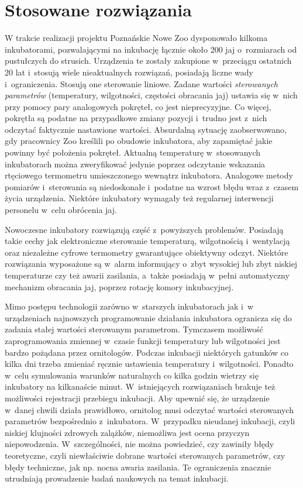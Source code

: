\section{Stosowane rozwiązania}
W trakcie realizacji projektu Poznańskie Nowe Zoo dysponowało kilkoma
inkubatorami, pozwalającymi na inkubację łącznie około 200 jaj o~rozmiarach od
pustułczych do strusich. Urządzenia te zostały zakupione w~przeciągu ostatnich
20 lat i~stosują wiele nieaktualnych rozwiązań, posiadają liczne wady
i~ograniczenia. Stosują one sterowanie liniowe. Zadane wartości \emph{sterowanych
parametrów} (temperatury, wilgotności, częstości obracania jaj) ustawia się
w~nich przy pomocy pary analogowych pokręteł, co jest nieprecyzyjne. Co więcej,
pokrętła są podatne na przypadkowe zmiany pozycji i~trudno jest z~nich odczytać
faktycznie nastawione wartości. Absurdalną sytuację zaobserwowano, gdy
pracownicy Zoo kreślili po obudowie inkubatora, aby zapamiętać jakie powinny być
położenia pokręteł. Aktualną temperaturę w~stosowanych
inkubatorach można zweryfikować jedynie poprzez odczytanie wskazania rtęciowego
termometru umieszczonego wewnątrz inkubatora. Analogowe metody pomiarów
i~sterowania są niedoskonałe i~podatne na wzrost błędu wraz z~czasem życia
urządzenia. Niektóre inkubatory wymagały też regularnej interwencji personelu
w~celu obrócenia jaj.

Nowoczesne inkubatory \cite{Brinsea} \cite{Metzer} rozwiązują część z~powyższych problemów. Posiadają takie
cechy jak elektroniczne sterowanie temperaturą, wilgotnością i~wentylacją oraz
niezależne cyfrowe termometry gwarantujące obiektywny odczyt. Niektóre
rozwiązania wyposażone są w~alarm informujący o~zbyt wysokiej lub zbyt niskiej
temperaturze czy też awarii zasilania, a~także posiadają w~pełni automatyczny
mechanizm obracania jaj, poprzez rotację komory inkubacyjnej.

Mimo postępu technologii zarówno w~starszych inkubatorach jak i~w urządzeniach najnowszych programowanie działania inkubatora ogranicza się do zadania stałej wartości
sterowanym parametrom. Tymczasem możliwość zaprogramowania zmiennej w~czasie
funkcji temperatury lub wilgotności jest bardzo pożądana przez ornitologów.
Podczas inkubacji niektórych gatunków co kilka dni trzeba zmieniać ręcznie
ustawienia temperatury i~wilgotności. Ponadto w~celu symulowania warunków
naturalnych co kilka godzin wietrzy się inkubatory na kilkanaście minut.
W~istniejących rozwiązaniach brakuje też możliwości rejestracji przebiegu
inkubacji. Aby upewnić się, że urządzenie w~danej chwili działa prawidłowo,
ornitolog musi odczytać wartości sterowanych parametrów bezpośrednio
z~inkubatora. W~przypadku nieudanej inkubacji, czyli niskiej klujności zdrowych
zalążków, niemożliwa jest ocena przyczyn niepowodzenia. W~szczególności, nie
można powiedzieć, czy zawiniły błędy teoretyczne, czyli niewłaściwie dobrane
wartości sterowanych parametrów, czy błędy techniczne, jak np. nocna awaria
zasilania. Te ograniczenia znacznie utrudniają prowadzenie badań naukowych na
temat inkubacji.

